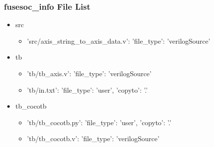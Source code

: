 \subsubsection{fusesoc\_info File List}
\begin{itemize}
\item src
	\begin{itemize}
	\item {'src/axis\_string\_to\_axis\_data.v': {'file\_type': 'verilogSource'}}
	\end{itemize}
\item tb
	\begin{itemize}
	\item {'tb/tb\_axis.v': {'file\_type': 'verilogSource'}}
	\item {'tb/in.txt': {'file\_type': 'user', 'copyto': '.'}}
	\end{itemize}
\item tb\_cocotb
	\begin{itemize}
	\item {'tb/tb\_cocotb.py': {'file\_type': 'user', 'copyto': '.'}}
	\item {'tb/tb\_cocotb.v': {'file\_type': 'verilogSource'}}
	\end{itemize}
\end{itemize}
